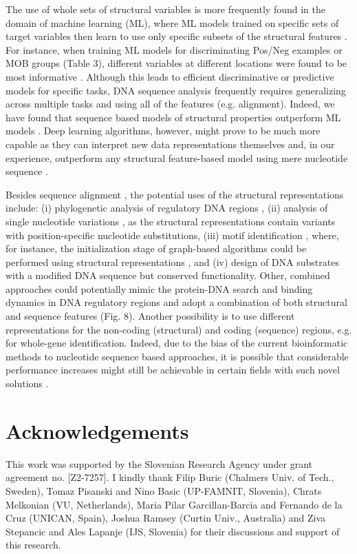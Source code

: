 \documentclass[10pt]{article}
\begin{document}
The use of whole sets of structural variables is more frequently found in the domain of machine learning (ML), where ML models trained on specific sets of target variables then learn to use only specific subsets of the structural features \cite{Zrimec2015-xf,Zrimec2018-lx,Zrimec2013-ds}. For instance, when training ML models for discriminating Pos/Neg examples or MOB groups (Table 3), different variables at different locations were found to be most informative \cite{Zrimec2018-lx}. Although this leads to efficient discriminative or predictive models for specific tasks, DNA sequence analysis frequently requires generalizing across multiple tasks and using all of the features (e.g. alignment). Indeed, we have found that sequence based models of structural properties outperform ML models \cite{Zrimec2020-wx,Zrimec2018-lx}. Deep learning algorithms, however, might prove to be much more capable as they can interpret new data representations themselves \cite{Bengio2013-xg} and, in our experience, outperform any structural feature-based model using mere nucleotide sequence \cite{Zrimec2019-ql}.

Besides sequence alignment \cite{Zrimec2020-wx}, the potential uses of the structural representations include: (i) phylogenetic analysis of regulatory DNA regions \cite{Garcillan-Barcia2009-yk}, (ii) analysis of single nucleotide variations \cite{Watson2008-dt}, as the structural representations contain variants with position-specific nucleotide substitutions, (iii) motif identification \cite{Samee2019-xj}, where, for instance, the initialization stage of graph-based algorithms could be performed using structural representations \cite{Stepancic2014-yu}, and (iv) design of DNA substrates with a modified DNA sequence but conserved functionality. Other, combined approaches could potentially mimic the protein-DNA search and binding dynamics in DNA regulatory regions \cite{Marcovitz2013-kg,Levo2015-iu,Slattery2014-ne,Rohs2009-hm} and adopt a combination of both structural and sequence features (Fig. 8). Another possibility is to use different representations for the non-coding (structural) and coding (sequence) regions, e.g. for whole-gene identification. Indeed, due to the bias of the current bioinformatic methods to nucleotide sequence based approaches, it is possible that considerable performance increases might still be achievable in certain fields with such novel solutions \cite{Zrimec2020-wx, Samee2019-xj}.


\section*{Acknowledgements}
This work was supported by the Slovenian Research Agency under grant agreement no. [Z2-7257]. I kindly thank Filip Buric (Chalmers Univ. of Tech., Sweden), Tomaz Pisanski and Nino Basic (UP-FAMNIT, Slovenia), Chrats Melkonian (VU, Netherlands), Maria Pilar Garcillan-Barcia and Fernando de la Cruz (UNICAN, Spain), Joshua Ramsey (Curtin Univ., Australia) and Ziva Stepancic and Ales Lapanje (IJS, Slovenia) for their discussions and support of this research.




\end{document}

